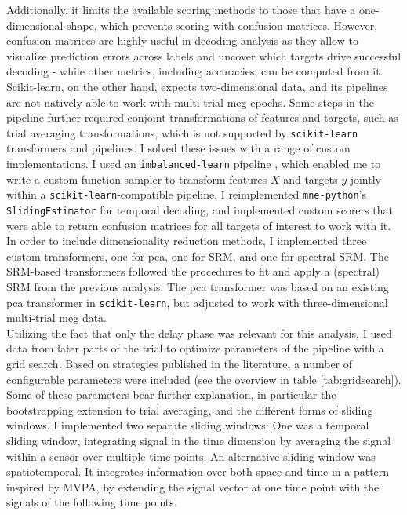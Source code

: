 Additionally, it limits the available scoring methods to those that have a one-dimensional shape, which prevents scoring with confusion matrices.
However, confusion matrices are highly useful in decoding analysis as they allow to visualize prediction errors across labels and uncover which targets drive successful decoding - while other metrics, including accuracies, can be computed from it.
Scikit-learn, on the other hand, expects two-dimensional data, and its pipelines are not natively able to work with multi trial \gls{meg} epochs.
Some steps in the pipeline further required conjoint transformations of features and targets, such as trial averaging transformations, which is not supported by \texttt{scikit-learn} transformers and pipelines.
I solved these issues with a range of custom implementations.
I used an \texttt{imbalanced-learn} pipeline \citep{JMLR:v18:16-365}, which enabled me to write a custom function sampler to transform features $X$ and targets $y$ jointly within a \texttt{scikit-learn}-compatible pipeline.
I reimplemented \texttt{mne-python}'s \texttt{SlidingEstimator} for temporal decoding, and implemented custom scorers that were able to return confusion matrices for all targets of interest to work with it.
In order to include dimensionality reduction methods, I implemented three custom transformers, one for \gls{pca}, one for \gls{SRM}, and one for spectral \gls{SRM}.
The \gls{SRM}-based transformers followed the procedures to fit and apply a (spectral) \gls{SRM} from the previous analysis.
The \gls{pca} transformer was based on an existing \gls{pca} transformer in \texttt{scikit-learn}, but adjusted to work with three-dimensional multi-trial \gls{meg} data.\\
Utilizing the fact that only the delay phase was relevant for this analysis, I used data from later parts of the trial to optimize parameters of the pipeline with a grid search.
Based on strategies published in the literature, a number of configurable parameters were included (see the overview in table \ref{tab:gridsearch}).\\
Some of these parameters bear further explanation, in particular the bootstrapping extension to trial averaging, and the different forms of sliding windows.
I implemented two separate sliding windows: One was a temporal sliding window, integrating signal in the time dimension by averaging the signal within a sensor over multiple time points.
An alternative sliding window was spatiotemporal.
It integrates information over both space and time in a pattern inspired by MVPA, by extending the signal vector at one time point with the signals of the following time points.

